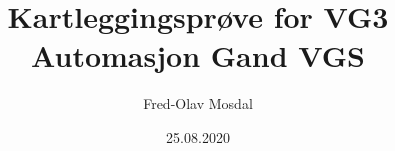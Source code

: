 \title {Kartleggingsprøve for VG3 Automasjon Gand VGS} 
\author {Fred-Olav Mosdal}
\date {25.08.2020}
\maketitle
